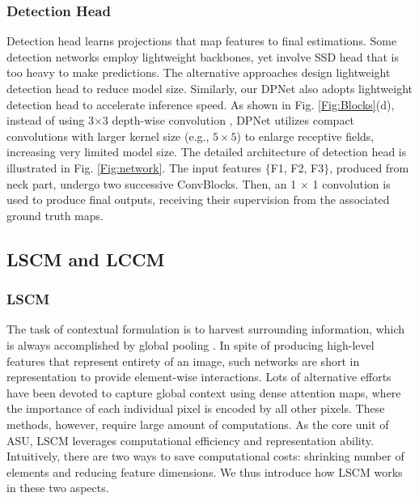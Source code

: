 \documentclass[lettersize,journal]{IEEEtran}
\begin{document}
\subsubsection{Detection Head} 

Detection head learns projections that map features to final estimations. Some detection networks \cite{howard2017mobilenets,sandler2018mobilenetv2} employ lightweight backbones, yet involve SSD head \cite{liu2016ssd} that is too heavy to make predictions. The alternative approaches \cite{qin2019thundernet,li2018tiny,Pelee} design lightweight detection head to reduce model size. Similarly, our DPNet also adopts lightweight detection head to accelerate inference speed. As shown in Fig. \ref{Fig:Blocks}(d), instead of using 3$\times$3 depth-wise convolution \cite{qin2019thundernet,li2018tiny,Pelee}, DPNet utilizes compact convolutions with larger kernel size (e.g., $ 5\times5$) to enlarge receptive fields, increasing very limited model size. The detailed architecture of detection head is illustrated in Fig. \ref{Fig:network}. The input features $\lbrace$F1, F2, F3$\rbrace$, produced from neck part, undergo two successive ConvBlocks. Then, an 1 $\times$ 1 convolution is used to produce final outputs, receiving their supervision from the associated ground truth maps.

\subsection{LSCM and LCCM}



\subsubsection{LSCM}

The task of contextual formulation is to harvest surrounding information, which is always accomplished by global pooling \cite{hu2018genet,woo2018cbam,ecanet}. In spite of producing high-level features that represent entirety of an image, such networks are short in representation to provide element-wise interactions. Lots of alternative efforts \cite{vaswani2017attention,wang2018non,liu2021Swin} have been devoted to capture global context using dense attention maps, where the importance of each individual pixel is encoded by all other pixels. These methods, however, require large amount of computations. As the core unit of ASU, LSCM leverages computational efficiency and representation ability. Intuitively, there are two ways to save computational costs: shrinking number of elements and reducing feature dimensions. We thus introduce how LSCM works in these two aspects.
\end{document}
